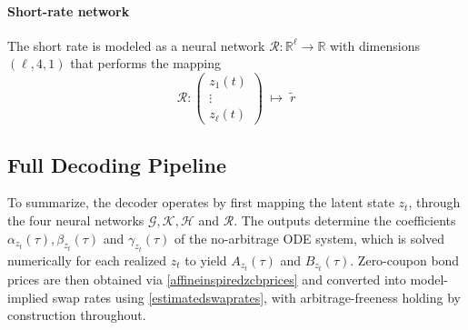 \paragraph{Short-rate network}

The short rate is modeled as a neural network $\mathcal{R}:\mathbb{R}^\ell \to \mathbb{R}$ with dimensions $(\ell,4,1)$ that performs the mapping
\[
\mathcal{R} :
\begin{pmatrix}
z_1(t) \\
\vdots \\
z_\ell(t)
\end{pmatrix}
\;\mapsto\;
\tilde{r}
\]




\subsection{Full Decoding Pipeline}


To summarize, the decoder operates by first mapping the latent state $z_t$, through the four neural networks $\mathcal{G},\mathcal{K},\mathcal{H}$ and $\mathcal{R}$. The outputs determine the coefficients $\alpha_{z_t}(\tau),\beta_{z_t}(\tau)$ and $\gamma_{z_t}(\tau)$ of the no-arbitrage ODE system, which is solved numerically for each realized $z_t$ to yield $A_{z_t}(\tau)$ and $B_{z_t}(\tau)$. Zero-coupon bond prices are then obtained via \eqref{affineinspiredzcbprices} and converted into model-implied swap rates using \eqref{estimatedswaprates}, with arbitrage-freeness holding by construction throughout.







